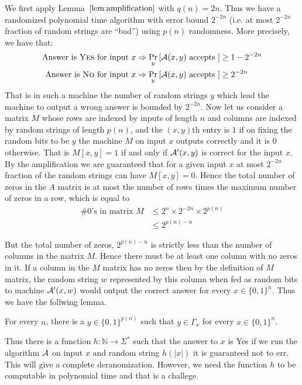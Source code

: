 We first apply Lemma~$\ref{lem:amplification}$ with $q(n) = 2n$. Thus we have a randomized polynomial time algorithm with error bound $2^{-2n}$ (i.e. at most $2^{-2n}$ fraction of random strings are ``bad'') using $p(n)$ randomness. More precisely, we have that:
\begin{align}
  \textrm{Answer is {\sc Yes} for input $x$} \implies \Pr_{y} \left[ {\cal{A}}(x,y) \text{ accepts } \right] & \geq
   1-2^{-2n} \\
  \textrm{Answer is {\sc No} for input $x$} \implies \Pr_{y}\left[ {\cal{A}}(x,y) \text{ accepts } \right] & \geq
   2^{-2n} 
\end{align}
That is in such a machine the number of random strings $y$ which lead
the machine to output a wrong answer is bounded by $2^{-2n}$. Now let
us consider a matrix $M$ whose rows are indexed by inputs of length
$n$ and columns are indexed by random strings of length $p(n)$, and
the $(x,y)$th entry is $1$ if on fixing the random bits to be $y$ the
machine $M$ on input $x$ outputs correctly and it is $0$
otherwise. That is $M[x,y]=1$ if and only if ${\cal{A'}}(x,y)$ is correct for the input $x$. By the amplification we
are guaranteed that for a given input $x$ at most $2^{-2n}$ fraction
of the random strings can have $M[x,y]=0$. Hence the total number of
zeros in the $A$ matrix is at most the number of rows times the
maximum number of zeros in a row, which is equal to 
\begin{eqnarray*}
  \text{\# 0's in matrix }M & \leq 2^n \times 2^{-2n} \times 2^{p(n)}
  \\
                            & \leq 2^{p(n)-n}
\end{eqnarray*}

But the total number of zeros, $2^{p(n)-n}$ is strictly less than the
number of columns in the matrix $M$. Hence there must be at least one
column with no zeros in it. If a column in the $M$ matrix has no zeros
then by the definition of $M$ matrix, the random string $w$ represented by
this column when fed as random bits to machine ${\cal{A}'}(x,w)$ would output
the correct answer for every $x\in \{0,1\}^{n}$. Thus we have the follwing lemma.

\begin{lemma}
For every $n$, there is a $y \in \{0,1\}^{p(n)}$ such that $y \in \Gamma_x$ for every $x \in \{0,1\}^n$.
\end{lemma}

Thus there is a function $h : \mathbb{N} \to \Sigma^*$ such that the answer to $x$ is {\sc Yes} if we run the algorithm $\calA$ on input $x$ and random string $h(|x|)$ it is guaranteed not to err. This will give a complete deranomization. However, we need the function $h$ to be computable in polynomial time and that is a challege.

